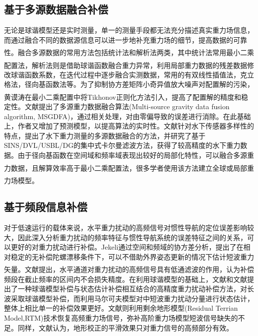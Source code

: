 \documentclass[12pt,a4,utf8]{article}
\newcommand{\upcite}[1]{\textsuperscript{\textsuperscript{\cite{#1}}}} %
\begin{document}
\subsection{基于多源数据融合补偿}
无论是球谐模型还是实时测量，单一的测量手段都无法充分描述真实重力场信息，而通过融合不同的数据源信息可以进一步地补充重力场的细节，提高数据的可靠性\upcite{DKXB20050100F}。融合多源数据的常用方法包括统计法和解析法两类\upcite{1020160654.nh}，其中统计法常用最小二乘配置法，解析法则是借助球谐函数融合重力异常\upcite{kern2003analysis,2009059209.nh}，利用局部重力数据的残差数据修改球谐函数系数，在迭代过程中逐步融合实测数据，常用的有双线性插值法，克立格法，径向基函数法等。为了抑制协方差矩阵小奇异值放大噪声对配置解的污染，黄谟涛在最小二乘配置中将Tikhonov正则化方法引入\upcite{HYCH201303004}，提高了配置解的精度和稳定性。文献\cite{LUOKAIXIN2023}提出了多源重力数据融合算法(Multi-source gravity data fusion algorithm, MSGDFA)，通过相关处理，对由零偏导致的误差进行消除。在此基础上，作者又增加了预测模型，以提高算法的实时性。文献\cite{1022810006.nh}针对水下传感器多样性的特点，提出了水下重力测量的多源数据融合的方法，并研究了基于SINS/DVL/USBL/DG的集中式卡尔曼滤波方法，获得了较高精度的水下重力数据。由于径向基函数在空间域和频率域表现出较好的局部化特性，可以融合多源重力数据，且解算效率高于最小二乘配置法\upcite{wittwer2009regional}，很多学者使用该方法建立全球或局部重力场模型\upcite{bentel2013different,bentel2016combining,pham2009solutions,klees2008data,CHXB201609003,DQWX201704009,mahbuby2017local,tenzer2008choice}。

\subsection{基于频段信息补偿}
对于低速运行的载体来说，水平重力扰动的高频信号对惯性导航的定位误差影响较大，因此深入分析重力扰动的频率特征与惯性导航系统的误差特征之间的关系，可以更好的对重力扰动进行补偿。Jekeli通过空间和频域的协方差分析，提出了在相对稳定的无补偿陀螺漂移条件下，可以不借助外界姿态更新的情况下估计短波重力矢量\upcite{jekeli1994airborne}。文献\cite{Zhuhongbao2024}提出，水平通道对重力扰动的高频信号具有低通滤波的作用，认为补偿频段在截止频率的区间内不会损失精度。在利用球谐模型的基础上，文献\cite{Liuyuxin2023}和文献\cite{dai2014improved}提出了一种球谐模型补偿与状态估计补偿相互结合的高精度重力扰动补偿方法，对长波采取球谐模型补偿，而利用马尔可夫模型对中短波重力扰动分量进行状态估计，整体上相比单一的补偿效果更好。文献\cite{Zhangpanpan23}则利用剩余地形模型(Residual Terrian Model,RTM)技术恢复高频重力场信号，弥补高阶重力场模型短波信号缺失的不足。同样，文献\cite{tenzer2010effect}认为，地形校正的平滑效果只对重力信号的高频部分有效。
\end{document}

